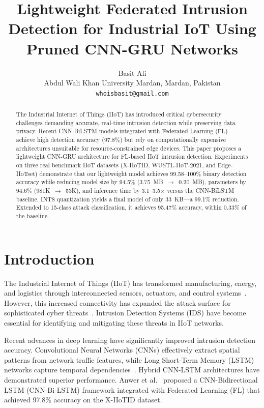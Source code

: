 \documentclass[12pt,a4paper]{article}
\title{Lightweight Federated Intrusion Detection for Industrial IoT Using Pruned CNN-GRU Networks}
\author{Basit Ali\\Abdul Wali Khan University Mardan, Mardan, Pakistan\\\texttt{whoisbasit@gmail.com}}
\begin{document}
\maketitle

\begin{abstract}
The Industrial Internet of Things (IIoT) has introduced critical cybersecurity challenges demanding accurate, real-time intrusion detection while preserving data privacy. Recent CNN-BiLSTM models integrated with Federated Learning (FL) achieve high detection accuracy (97.8\%) but rely on computationally expensive architectures unsuitable for resource-constrained edge devices. This paper proposes a lightweight CNN-GRU architecture for FL-based IIoT intrusion detection. Experiments on three real benchmark IIoT datasets (X-IIoTID, WUSTL-IIoT-2021, and Edge-IIoTset) demonstrate that our lightweight model achieves 99.58--100\% binary detection accuracy while reducing model size by 94.5\% (3.75~MB~$\rightarrow$~0.20~MB), parameters by 94.6\% (981K~$\rightarrow$~53K), and inference time by 3.1--3.5$\times$ versus the CNN-BiLSTM baseline. INT8 quantization yields a final model of only 33~KB---a 99.1\% reduction. Extended to 15-class attack classification, it achieves 95.47\% accuracy, within 0.33\% of the baseline.
\end{abstract}

\section{Introduction}

The Industrial Internet of Things (IIoT) has transformed manufacturing, energy, and logistics through interconnected sensors, actuators, and control systems~\cite{xu2014survey,boyes2018framework}. However, this increased connectivity has expanded the attack surface for sophisticated cyber threats~\cite{hassanzadeh2020review,zolanvari2019machine}. Intrusion Detection Systems (IDS) have become essential for identifying and mitigating these threats in IIoT networks.

Recent advances in deep learning have significantly improved intrusion detection accuracy. Convolutional Neural Networks (CNNs) effectively extract spatial patterns from network traffic features, while Long Short-Term Memory (LSTM) networks capture temporal dependencies~\cite{vinayakumar2017cnn,chawla2022hybrid}. Hybrid CNN-LSTM architectures have demonstrated superior performance. Anwer et al.~\cite{anwer2025advanced} proposed a CNN-Bidirectional LSTM (CNN-Bi-LSTM) framework integrated with Federated Learning (FL) that achieved 97.8\% accuracy on the X-IIoTID dataset.
\end{document}
